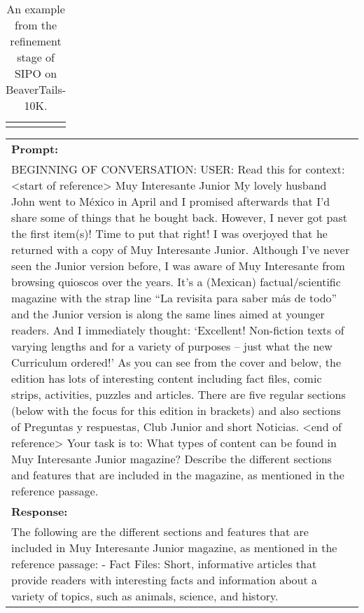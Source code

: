 \begin{table*}[t]
\begin{tabular}{p{}}
\Xhline{1.5pt}
\end{tabular}
\caption{An example from the refinement stage of SIPO on BeaverTails-10K.}
\label{case study beavertail}
\end{table*}

\begin{table*}[t]
\centering
\begin{tabular}{p{}}
\Xhline{1.5pt}
\textbf{Prompt:} \\
BEGINNING OF CONVERSATION: USER: Read this for context:\newline
<start of reference>\newline
Muy Interesante Junior\newline
My lovely husband John went to México in April and I promised afterwards that I’d share some of things that he bought back. However, I never got past the first item(s)! Time to put that right! I was overjoyed that he returned with a copy of Muy Interesante Junior. Although I’ve never seen the Junior version before, I was aware of Muy Interesante from browsing quioscos over the years. It’s a (Mexican) factual/scientific magazine with the strap line “La revisita para saber más de todo” and the Junior version is along the same lines aimed at younger readers.  And I immediately thought: ‘Excellent! Non-fiction texts of varying lengths and for a variety of purposes – just what the new Curriculum ordered!’ As you can see from the cover and below, the edition has lots of interesting content including fact files, comic strips, activities, puzzles and articles. There are five regular sections (below with the focus for this edition in brackets) and also sections of Preguntas y respuestas, Club Junior and short Noticias.\newline
<end of reference>\newline
Your task is to:\newline
What types of content can be found in Muy Interesante Junior magazine? Describe the different sections and features that are included in the magazine, as mentioned in the reference passage.  \\
\hline
\textbf{Response:} \\
The following are the different sections and features that are included in Muy Interesante Junior magazine, as mentioned in the reference passage:\newline
- Fact Files: Short, informative articles that provide readers with interesting facts and information about a variety of topics, such as animals, science, and history.\newline

\end{tabular}
\end{table*}
